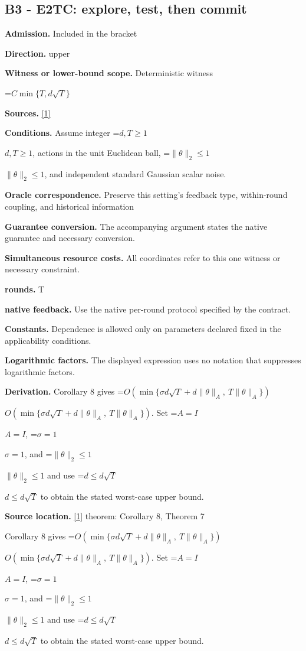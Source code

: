 \documentclass[10pt,a4paper]{article}
\newcommand{\AtlasMath}[1]{\par\begingroup\centering\setbox0=\hbox{$\displaystyle #1$}\ifdim\wd0>1.4\linewidth\typeout{ATLAS WIDE FORMULA: \the\wd0}\fi\ifdim\wd0>\linewidth\resizebox{\linewidth}{!}{\box0}\else\box0\fi\par\endgroup}
\newcommand{\AtlasInlineMath}[1]{\begingroup\setbox0=\hbox{$#1$}\ifdim\wd0>.4\linewidth\endgroup\AtlasMath{#1}\else\endgroup$#1$\fi}
\begin{document}
\subsection{B3 - E2TC: explore, test, then commit}
\textbf{Admission.} Included in the bracket

\textbf{Direction.} upper

\textbf{Witness or lower-bound scope.} Deterministic witness

\AtlasMath{C\min\{T,d\sqrt T\}}
\textbf{Sources.} \href{https://proceedings.mlr.press/v291/zhang25b.html}{[1]}

\textbf{Conditions.} Assume integer \AtlasInlineMath{d,T\ge1}, actions in the unit Euclidean ball, \AtlasInlineMath{\|\theta\|_2\le1}, and independent standard Gaussian scalar noise.

\textbf{Oracle correspondence.} Preserve this setting's feedback type, within-round coupling, and historical information

\textbf{Guarantee conversion.} The accompanying argument states the native guarantee and necessary conversion.

\textbf{Simultaneous resource costs.} All coordinates refer to this one witness or necessary constraint.

\textbf{rounds.} T

\textbf{native feedback.} Use the native per-round protocol specified by the contract.

\textbf{Constants.} Dependence is allowed only on parameters declared fixed in the applicability conditions.

\textbf{Logarithmic factors.} The displayed expression uses no notation that suppresses logarithmic factors.

\textbf{Derivation.} Corollary 8 gives \AtlasInlineMath{O(\min\{\sigma d\sqrt T+d\|\theta\|_A,\ T\|\theta\|_A\})}. Set \AtlasInlineMath{A=I}, \AtlasInlineMath{\sigma=1}, and \AtlasInlineMath{\|\theta\|_2\le1} and use \AtlasInlineMath{d\le d\sqrt T} to obtain the stated worst-case upper bound.

\textbf{Source location.} \href{https://proceedings.mlr.press/v291/zhang25b.html}{[1]} theorem: Corollary 8, Theorem 7

Corollary 8 gives \AtlasInlineMath{O(\min\{\sigma d\sqrt T+d\|\theta\|_A,\ T\|\theta\|_A\})}. Set \AtlasInlineMath{A=I}, \AtlasInlineMath{\sigma=1}, and \AtlasInlineMath{\|\theta\|_2\le1} and use \AtlasInlineMath{d\le d\sqrt T} to obtain the stated worst-case upper bound.
\end{document}
